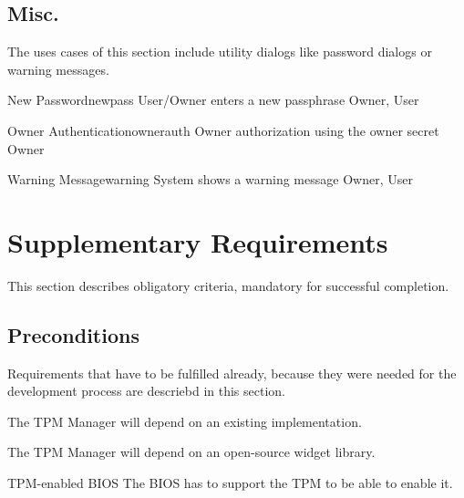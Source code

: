 \documentclass[
  american        %
]{sirrixreport}
\begin{document}
\subsection{Misc.}
The uses cases of this section include utility dialogs like password dialogs or warning messages.

\begin{usecase}{New Password}{newpass}
\ucdesc User/Owner enters a new passphrase
\ucactors  Owner, User
\end{usecase}

\begin{usecase}{Owner Authentication}{ownerauth}
\ucdesc Owner authorization using the owner secret
\ucactors  Owner
\end{usecase}

\begin{usecase}{Warning Message}{warning}
\ucdesc System shows a warning message
\ucactors  Owner, User
\end{usecase}
\clearpage

\section{Supplementary Requirements}

This section describes obligatory criteria, mandatory for successful completion.

\subsection{Preconditions}


Requirements that have to be fulfilled already, because they were
 needed for the development process are descriebd in this section.

The TPM Manager will depend on an existing \TSS implementation.

The TPM Manager will depend on an open-source widget library.

 {TPM-enabled BIOS}
The BIOS has to support the TPM to be able to enable it.

\end{document}
